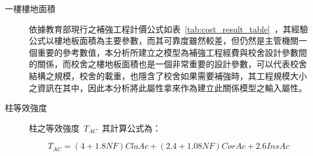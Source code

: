 \begin{description}
  \item[一樓樓地面積]
  依據教育部現行之補強工程計價公式如表~\ref{tab:cost_result_table}~，其經驗公式以樓地板面積為主要參數，而其可靠度雖然較差，但仍然是主管機關一個重要的參考數值，本分析所建立之模型為補強工程經費與校舍設計參數間的關係，而校舍之樓地板面積也是一個非常重要的設計參數，可以代表校舍結構之規模，校舍的載重，也隱含了校舍如果需要補強時，其工程規模大小之資訊在其中，因此本分析將此屬性拿來作為建立此關係模型之輸入屬性。
  \item[柱等效強度]
  柱之等效強度~$T_{AC}$~其計算公式為：

  \begin{equation}T_{AC} = (4+1.8NF)ClaAc+(2.4+1.08NF)CorAc+2.6InsAc\end{equation} 


\end{description}
